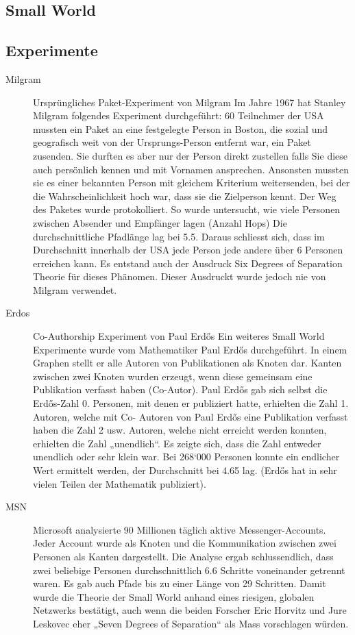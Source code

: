 \documentclass[a4paper,landscape,12pt]{scrreprt}
\begin{document}
\begin{multicols*}{2}
\chapter{Small World} %
\label{cha:small_world}
\section{Experimente} %
\label{sec:experimente}
\begin{description}
	\item[Milgram]Ursprüngliches Paket-Experiment von Milgram
Im Jahre 1967 hat Stanley Milgram folgendes Experiment durchgeführt: 60 Teilnehmer der USA
mussten ein Paket an eine festgelegte Person in Boston, die sozial und geografisch weit von der
Ursprungs-Person entfernt war, ein Paket zusenden. Sie durften es aber nur der Person direkt zustellen
falls Sie diese auch persönlich kennen und mit Vornamen ansprechen. Ansonsten mussten sie es einer
bekannten Person mit gleichem Kriterium weitersenden, bei der die Wahrscheinlichkeit hoch war, dass
sie die Zielperson kennt. Der Weg des Paketes wurde protokolliert. So wurde untersucht, wie viele
Personen zwischen Absender und Empfänger lagen (Anzahl Hops)
Die durchschnittliche Pfadlänge lag bei 5.5. Daraus schliesst sich, dass im Durchschnitt innerhalb der
USA jede Person jede andere über 6 Personen erreichen kann. Es entstand auch der Ausdruck Six
Degrees of Separation Theorie für dieses Phänomen. Dieser Ausdruckt wurde jedoch nie von Milgram
verwendet.
\item[Erdos] Co-Authorship Experiment von Paul Erdős
Ein weiteres Small World Experimente wurde vom Mathematiker Paul Erdős durchgeführt. In einem
Graphen stellt er alle Autoren von Publikationen als Knoten dar. Kanten zwischen zwei Knoten wurden
erzeugt, wenn diese gemeinsam eine Publikation verfasst haben (Co-Autor). Paul Erdős gab sich selbst
die Erdős-Zahl 0. Personen, mit denen er publiziert hatte, erhielten die Zahl 1. Autoren, welche mit Co-
Autoren von Paul Erdős eine Publikation verfasst haben die Zahl 2 usw.
Autoren, welche nicht erreicht werden konnten, erhielten die Zahl „unendlich“. Es zeigte sich, dass die
Zahl entweder unendlich oder sehr klein war. Bei 268‘000 Personen konnte ein endlicher Wert
ermittelt werden, der Durchschnitt bei 4.65 lag. (Erdős hat in sehr vielen Teilen der Mathematik
publiziert).
\item[MSN]Microsoft analysierte 90 Millionen täglich aktive Messenger-Accounts. Jeder Account wurde als Knoten
und die Kommunikation zwischen zwei Personen als Kanten dargestellt. Die Analyse ergab
schlussendlich, dass zwei beliebige Personen durchschnittlich 6.6 Schritte voneinander getrennt
waren. Es gab auch Pfade bis zu einer Länge von 29 Schritten. Damit wurde die Theorie der Small World
anhand eines riesigen, globalen Netzwerks bestätigt, auch wenn die beiden Forscher Eric Horvitz und
Jure Leskovec eher „Seven Degrees of Separation“ als Mass vorschlagen würden. 
\end{description}
\newpage

\end{multicols*}
\end{document}

